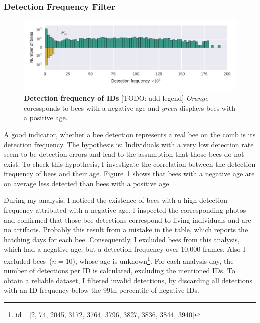 \subsubsection{Detection Frequency Filter}
\begin{figure}[t]
	\centering
	\includegraphics[width=1.0\textwidth]{Figures/filter}
	\caption[Detection frequency of IDs]{\textbf{Detection frequency of IDs} [TODO: add legend] \emph{Orange} coressponds to bees with a negative age and \emph{green} displays bees with a positive age.\protect\footnotemark}
	\label{fig:filter}
\end{figure}

A good indicator, whether a bee detection represents a real bee on the comb is its detection frequency.
The hypothesis is:
Individuals with a very low detection rate seem to be detection errors and lead to the assumption that those bees do not exist.
To check this hypothesis, I investigate the correlation between the detection frequency of bees and their age.
Figure~\ref{fig:filter} shows that bees with a negative age are on average less detected than bees with a positive age.

During my analysis, I noticed the existence of bees with a high detection frequency attributed with a negative age. I inspected the corresponding photos and confirmed that those bee detections correspond to living individuals and are no artifacts. Probably this result from a mistake in the table, which reports the hatching days for each bee.
Consequently, I excluded bees from this analysis, which had a negative age, but a detection frequency over 10,000 frames. Also I excluded bees~($n=10$), whose age is unknown\footnote{id= [2,
    74,
    2045,
    3172,
    3764,
    3796,
    3827,
    3836,
    3844,
    3940]}.
For each analysis day, the number of detections per ID is calculated, excluding the mentioned IDs.
To obtain a reliable dataset, I filtered invalid detections, by discarding all detections with an ID frequency below the 99th percentile of negative IDs.


